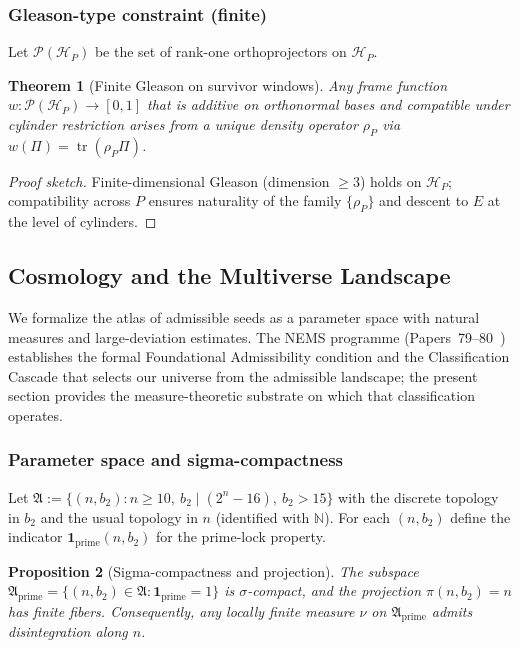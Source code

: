 \documentclass[12pt]{article}
\newtheorem{theorem}{Theorem}[section]
\newtheorem{proposition}[theorem]{Proposition}
\numberwithin{equation}{section}
\newcommand{\N}{\mathbb{N}}
\begin{document}
\subsubsection{Gleason-type constraint (finite)}
Let $\mathcal{P}(\mathcal{H}_P)$ be the set of rank-one orthoprojectors on $\mathcal{H}_P$.

\begin{theorem}[Finite Gleason on survivor windows]\label{thm:gleason-finite}
Any frame function $w: \mathcal{P}(\mathcal{H}_P)\to [0,1]$ that is additive on orthonormal bases and compatible under cylinder restriction arises from a unique density operator $\rho_P$ via $w(\Pi)=\operatorname{tr}(\rho_P\Pi)$.
\end{theorem}

\begin{proof}[Proof sketch]
Finite-dimensional Gleason (dimension $\ge 3$) holds on $\mathcal{H}_P$; compatibility across $P$ ensures naturality of the family $\{\rho_P\}$ and descent to $E$ at the level of cylinders.
\end{proof}

\subsection{Cosmology and the Multiverse Landscape}\label{sec:cosmo-bridge}
We formalize the atlas of admissible seeds as a parameter space with natural measures and large-deviation estimates. The NEMS programme (Papers~79--80~\cite{SpivackNEMSHub}) establishes the formal Foundational Admissibility condition and the Classification Cascade that selects our universe from the admissible landscape; the present section provides the measure-theoretic substrate on which that classification operates.

\subsubsection{Parameter space and sigma-compactness}
Let $\mathfrak{A}:=\{(n,b_2): n\ge 10,\ b_2\mid (2^n-16),\ b_2>15\}$ with the discrete topology in $b_2$ and the usual topology in $n$ (identified with $\N$). For each $(n,b_2)$ define the indicator $\mathbf{1}_{\mathrm{prime}}(n,b_2)$ for the prime-lock property.

\begin{proposition}[Sigma-compactness and projection]\label{prop:sigmacompact}
The subspace $\mathfrak{A}_{\mathrm{prime}}=\{(n,b_2)\in\mathfrak{A}: \mathbf{1}_{\mathrm{prime}}=1\}$ is $\sigma$-compact, and the projection $\pi(n,b_2)=n$ has finite fibers. Consequently, any locally finite measure $\nu$ on $\mathfrak{A}_{\mathrm{prime}}$ admits disintegration along $n$.
\end{proposition}
\end{document}
